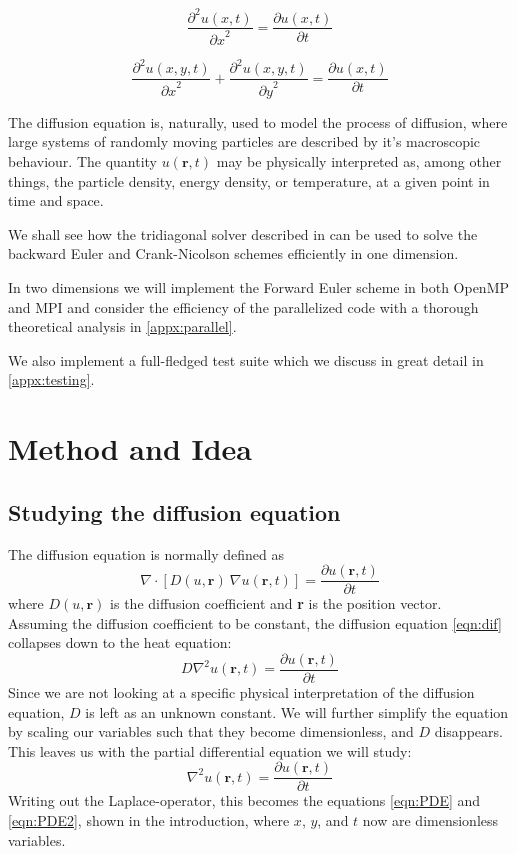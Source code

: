 \documentclass[10pt,a4paper]{article}
\newcommand{\pt}{{\partial t}}
\newcommand{\px}{{\partial x}}
\newcommand{\py}{{\partial y}}
\newcommand{\pu}{{\partial u}}
\newcommand{\ppu}{{\partial^2 u}}
\begin{document}
\begin{equation}\label{eqn:PDE}
\frac{\ppu(x,t)}{\px^2} = \frac{\pu(x,t)}{\pt}
\end{equation}

\begin{equation}\label{eqn:PDE2}
\frac{\ppu(x,y,t)}{\px^2} + \frac{\ppu(x,y,t)}{\py^2} = \frac{\pu(x,t)}{\pt}
\end{equation}


The diffusion equation is, naturally, used to model the process of diffusion, where large systems of randomly moving particles are described by it's macroscopic behaviour. The quantity $u(\textbf{r},t)$ may be physically interpreted as, among other things, the particle density, energy density, or temperature, at a given point in time and space.

We shall see how the tridiagonal solver described in \cite{hustad_lunde_project1} can be used to solve the backward Euler and Crank-Nicolson schemes efficiently in one dimension.

In two dimensions we will implement the Forward Euler scheme in both OpenMP and MPI and consider the efficiency of the parallelized code with a thorough theoretical analysis in \ref{appx:parallel}.

We also implement a full-fledged test suite which we discuss in great detail in \ref{appx:testing}.

\section{Method and Idea}

\subsection{Studying the diffusion equation}\label{sec:dif}

The diffusion equation is normally defined as
\begin{equation}\label{eqn:dif}
\nabla \cdot \left[D(u,\textbf{r}) \ \nabla u(\textbf{r},t)\right] = \frac{\pu(\textbf{r},t)}{\pt}
\end{equation}
where $D(u,\textbf{r})$ is the diffusion coefficient and \textbf{r} is the position vector.
\\
Assuming the diffusion coefficient to be constant, the diffusion equation \vref{eqn:dif} collapses down to the heat equation:
\begin{equation}
D \nabla^2 u(\textbf{r},t) = \frac{\pu(\textbf{r},t)}{\pt}
\end{equation}
Since we are not looking at a specific physical interpretation of the diffusion equation, $D$ is left as an unknown constant. We will further simplify the equation by scaling our variables such that they become dimensionless, and $D$ disappears. This leaves us with the partial differential equation we will study:
\begin{equation}\label{eq:dif_simple}
\nabla^2 u(\textbf{r},t) = \frac{\pu(\textbf{r},t)}{\pt}
\end{equation}
Writing out the Laplace-operator, this becomes the equations \ref{eqn:PDE} and \ref{eqn:PDE2}, shown in the introduction, where $x$, $y$, and $t$ now are dimensionless variables.
\end{document}

